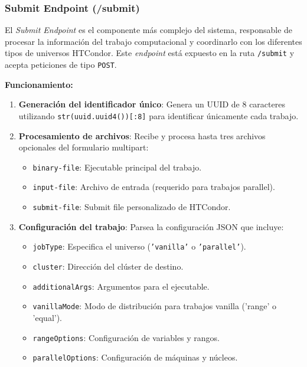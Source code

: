 \subsubsection{Submit Endpoint (/submit)}
\noindent

El \textit{Submit Endpoint} es el componente más complejo del sistema, responsable de procesar la información del trabajo computacional y coordinarlo con los diferentes tipos de universos HTCondor. Este \textit{endpoint} está expuesto en la ruta \texttt{/submit} y acepta peticiones de tipo \texttt{POST}.

\textbf{Funcionamiento:}

\begin{enumerate}
	\item \textbf{Generación del identificador único}: Genera un UUID de 8 caracteres utilizando \texttt{str(uuid.uuid4())[:8]} para identificar únicamente cada trabajo.

	\item \textbf{Procesamiento de archivos}: Recibe y procesa hasta tres archivos opcionales del formulario multipart:
	      \begin{itemize}
		      \item \texttt{binary-file}: Ejecutable principal del trabajo.
		      \item \texttt{input-file}: Archivo de entrada (requerido para trabajos parallel).
		      \item \texttt{submit-file}: Submit file personalizado de HTCondor.
	      \end{itemize}

	\item \textbf{Configuración del trabajo}: Parsea la configuración JSON que incluye:
	      \begin{itemize}
		      \item \texttt{jobType}: Especifica el universo (\texttt{'vanilla'} o \texttt{'parallel'}).
		      \item \texttt{cluster}: Dirección del clúster de destino.
		      \item \texttt{additionalArgs}: Argumentos para el ejecutable.
		      \item \texttt{vanillaMode}: Modo de distribución para trabajos vanilla ('range' o 'equal').
		      \item \texttt{rangeOptions}: Configuración de variables y rangos.
		      \item \texttt{parallelOptions}: Configuración de máquinas y núcleos.
	      \end{itemize}


\end{enumerate}
